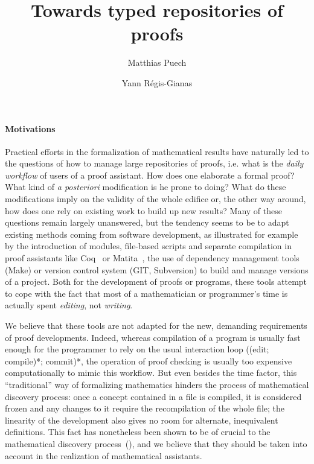 \documentclass{article}
\title{Towards typed repositories of proofs}
\author{Matthias Puech \and Yann Régis-Gianas}
\date{}
\newcommand{\remplan}[1]{\noindent\textcolor{bwblue}{$\triangleright$ \textbf{#1}}}
\renewcommand{\remplan}[1]{}
\begin{document}
\maketitle

\paragraph{Motivations}

\remplan{Motivations générales}

Practical efforts in the formalization of mathematical results have
naturally led to the questions of how to manage large repositories of
proofs, i.e. what is the \emph{daily workflow} of users of a proof
assistant. How does one elaborate a formal proof? What kind of \emph{a
  posteriori} modification is he prone to doing? What do these
modifications imply on the validity of the whole edifice or, the other
way around, how does one rely on existing work to build up new results?
Many of these questions remain largely unanswered, but the tendency
seems to be to adapt existing methods coming from software
development, as illustrated for example by the introduction of
modules, file-based scripts and separate compilation in proof
assistants like \textsf{Coq}~\cite{CoqDocWeb} or
\textsf{Matita}~\cite{AspertiCTZ07}, the use of
dependency management tools (\textsf{Make}) or version control system
(\textsf{GIT}, \textsf{Subversion}) to build and manage versions of a
project. Both for the development of proofs or programs, these tools
attempt to cope with the fact that most of a mathematician or
programmer's time is actually spent \emph{editing}, not
\emph{writing}.

We believe that these tools are not adapted for the new, demanding
requirements of proof developments. Indeed, whereas compilation of a
program is usually fast enough for the programmer to rely on the usual
interaction loop ((edit; compile)*; commit)*, the operation of proof
checking is usually too expensive computationally to mimic this
workflow. But even besides the time factor, this ``traditional'' way
of formalizing mathematics hinders the process of mathematical
discovery process: once a concept contained in a file is compiled, it
is considered frozen and any changes to it require the recompilation
of the whole file; the linearity of the development also gives no room
for alternate, inequivalent definitions. This fact has nonetheless
been shown to be of crucial to the mathematical discovery
process~(\cite{lakatos1964proofs}), and we believe that they should be
taken into account in the realization of mathematical assistants.
\end{document}
